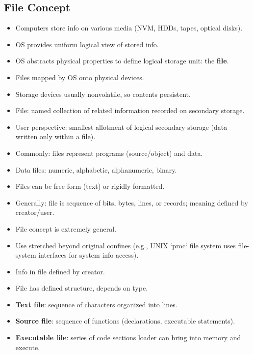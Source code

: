 \subsection*{File Concept}
\begin{itemize}
    \item Computers store info on various media (NVM, HDDs, tapes, optical disks).
    \item OS provides uniform logical view of stored info.
    \item OS abstracts physical properties to define logical storage unit: the \textbf{file}.
    \item Files mapped by OS onto physical devices.
    \item Storage devices usually nonvolatile, so contents persistent.
    \item File: named collection of related information recorded on secondary storage.
    \item User perspective: smallest allotment of logical secondary storage (data written only within a file).
    \item Commonly: files represent programs (source/object) and data.
    \item Data files: numeric, alphabetic, alphanumeric, binary.
    \item Files can be free form (text) or rigidly formatted.
    \item Generally: file is sequence of bits, bytes, lines, or records; meaning defined by creator/user.
    \item File concept is extremely general.
    \item Use stretched beyond original confines (e.g., UNIX `proc` file system uses file-system interfaces for system info access).
    \item Info in file defined by creator.
    \item File has defined structure, depends on type.
    \item \textbf{Text file}: sequence of characters organized into lines.
    \item \textbf{Source file}: sequence of functions (declarations, executable statements).
    \item \textbf{Executable file}: series of code sections loader can bring into memory and execute.
\end{itemize}

